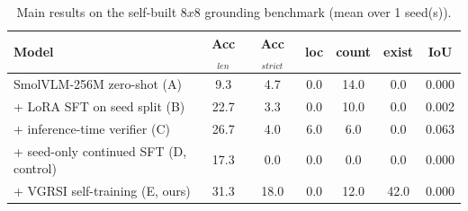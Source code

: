 \begin{table}[t]
\centering
\small
\caption{Main results on the self-built $8x8$ grounding benchmark (mean over 1 seed(s)).}
\label{tab:main}
\begin{tabular}{lcccccc}
\toprule
Model & Acc$_{len}$ & Acc$_{strict}$ & loc & count & exist & IoU \\
\midrule
SmolVLM-256M zero-shot (A) & 9.3 & 4.7 & 0.0 & 14.0 & 0.0 & 0.000 \\
+ LoRA SFT on seed split (B) & 22.7 & 3.3 & 0.0 & 10.0 & 0.0 & 0.002 \\
+ inference-time verifier (C) & 26.7 & 4.0 & 6.0 & 6.0 & 0.0 & 0.063 \\
+ seed-only continued SFT (D, control) & 17.3 & 0.0 & 0.0 & 0.0 & 0.0 & 0.000 \\
+ VGRSI self-training (E, ours) & 31.3 & 18.0 & 0.0 & 12.0 & 42.0 & 0.000 \\
\bottomrule
\end{tabular}
\end{table}
